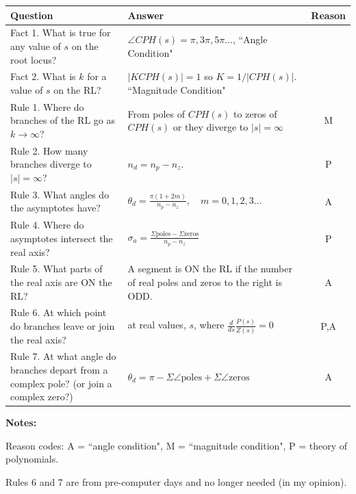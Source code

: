 \renewcommand\arraystretch{2.5}%
\begin{tabular}{p{2.5in}|p{2.5in}|c}
Question			&  Answer			& Reason	\\ \hline \hline
Fact 1. What is true for any value of $s$ on the root locus?
				&  $\angle{CPH(s)} = \pi, 3\pi, 5\pi \dots$, ``Angle Condition" &     \\ \hline
Fact 2. What is $k$ for a value of $s$ on the RL?  &
$|KCPH(s)| = 1$ so $ K = 1/|CPH(s)|$. ``Magnitude Condition"                          &     \\ \hline\hline
Rule 1. Where do branches of the RL go as $k \to \infty$?  &
From poles of $CPH(s)$ to zeros of $CPH(s)$ or they diverge to $|s| = \infty$         & M     \\ \hline
Rule 2. How many branches diverge to  $|s| = \infty$?      &
$n_d = n_p-n_z$.                                                                & P      \\ \hline
Rule 3. What angles do the asymptotes have?                 &
$\theta_d = \frac{\pi(1+2m)}{n_p-n_z},\quad m= 0,1,2,3\dots$                    & A      \\ \hline
Rule 4. Where do asymptotes intersect the real axis?        &
$\sigma_a = \frac{\Sigma\mathrm{poles}- \Sigma\mathrm{zeros}}{n_p-n_z} $        & P      \\ \hline
Rule 5. What parts of the real axis are ON the RL?          &
A segment is ON the RL if the number of real poles and zeros to the right is ODD. & A     \\ \hline \hline
Rule 6. At which point do branches leave or join the real axis?    &
at real values, $s$, where $\frac{d}{ds}\frac{P(s)}{Z(s)}=0$                      & P,A    \\ \hline
Rule 7. At what angle do branches depart from a complex pole? (or join a complex zero?) &
$\theta_d = \pi-\Sigma\angle\mathrm{poles} + \Sigma\angle\mathrm{zeros} $           & A      \\ \hline
\end{tabular}


{\bf Notes:}

Reason codes: 
A = ``angle condition", M = ``magnitude condition", P = theory of polynomials.

Rules 6 and 7 are from pre-computer days and no longer needed (in my opinion).













